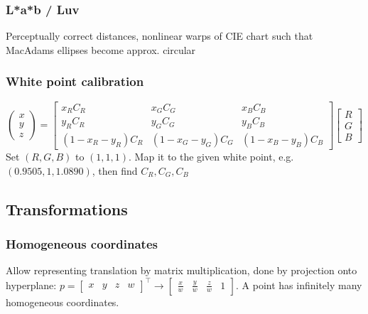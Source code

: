 \documentclass[a4paper,10pt]{article}
\begin{document}
\subsubsection{L*a*b / Luv} Perceptually correct distances, nonlinear warps of CIE chart such that MacAdams ellipses become approx. circular

\subsubsection{White point calibration}
\[
    \left(\begin{smallmatrix} x \\ y \\ z \end{smallmatrix}\right) = \left[\begin{smallmatrix} x_R C_R & x_G C_G & x_B C_B \\ y_R C_R & y_G C_G & y_B C_B \\ (1-x_R-y_R)C_R & (1-x_G-y_G)C_G & (1-x_B-y_B)C_B \end{smallmatrix}\right] \left[\begin{smallmatrix}R\\G\\B\end{smallmatrix}\right]
\] 
Set \( (R,G,B) \) to \( (1,1,1) \). Map it to the given white point, e.g. \( (0.9505, 1, 1.0890) \), then find \( C_R, C_G, C_B \)

\subsection{Transformations}
\subsubsection{Homogeneous coordinates}
Allow representing translation by matrix multiplication, done by projection onto hyperplane: \( p = \left[\begin{smallmatrix}x & y & z & w\end{smallmatrix}\right]^\top \to \left[\begin{smallmatrix}\frac{x}{w} & \frac{y}{w} & \frac{z}{w} & 1\end{smallmatrix}\right] \).
A point has infinitely many homogeneous coordinates.
\end{document}
